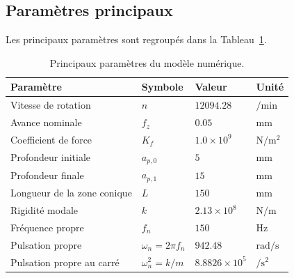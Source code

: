 \documentclass[
    11pt,
    a4paper
]{article}
\begin{document}
\subsection{Paramètres principaux}
\label{subsec:parametres}

Les principaux paramètres sont regroupés dans la
Tableau~\ref{tab:parametres_simulation}.


\begin{table}[H]
    \centering
    \caption{Principaux paramètres du modèle numérique.}
    \label{tab:parametres_simulation}
    \begin{tabular}{llll}
        \toprule
        Paramètre & Symbole & Valeur & Unité \\
        \midrule

        Vitesse de rotation
        & \(n\)
        & \(12094.28\)
        & \(\si{\per\minute}\) \\

        Avance nominale
        & \(f_z\)
        & \(0.05\)
        & \(\si{\milli\metre}\) \\

        Coefficient de force
        & \(K_f\)
        & \(1.0\times10^{9}\)
        & \(\si{\newton\per\metre\squared}\) \\

        Profondeur initiale
        & \(a_{p,0}\)
        & \(5\)
        & \(\si{\milli\metre}\) \\

        Profondeur finale
        & \(a_{p,1}\)
        & \(15\)
        & \(\si{\milli\metre}\) \\

        Longueur de la zone conique
        & \(L\)
        & \(150\)
        & \(\si{\milli\metre}\) \\

        Rigidité modale
        & \(k\)
        & \(2.13\times10^{8}\)
        & \(\si{\newton\per\metre}\) \\

        Fréquence propre
        & \(f_n\)
        & \(150\)
        & \(\si{\hertz}\) \\

        Pulsation propre
        & \(\omega_n=2\pi f_n\)
        & \(942.48\)
        & \(\si{\radian\per\second}\) \\

        Pulsation propre au carré
        & \(\omega_n^2=k/m\)
        & \(8.8826\times10^{5}\)
        & \(\si{\per\second\squared}\) \\


\end{tabular}
\end{table}
\end{document}
